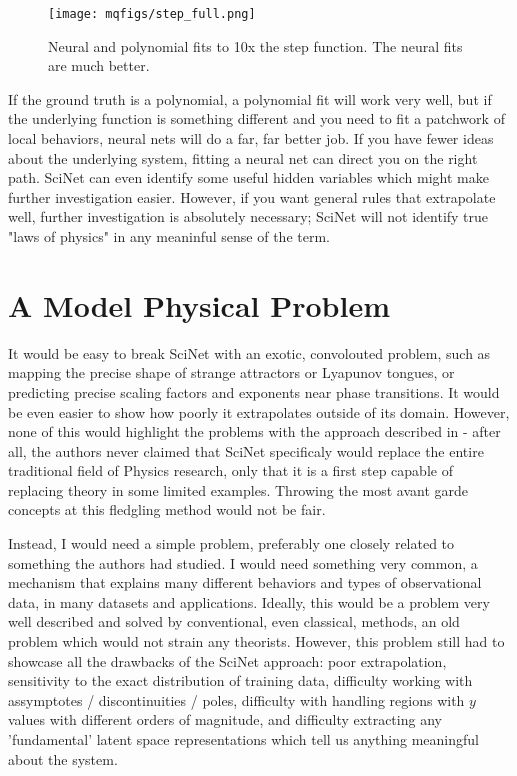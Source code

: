 \documentclass[aps,prl,preprint,groupedaddress]{revtex4-1}
\begin{document}
\begin{figure}[h]
   \centering
   \texttt{[image: mqfigs/step\_full.png]}
   \caption{\label{stepfull} Neural and polynomial fits to 10x the step function. The neural fits are much better.}
\end{figure}

If the ground truth is a polynomial, a polynomial fit will work very well, but if the underlying function is something different and you need to fit a patchwork of local behaviors, neural nets will do a far, far better job. If you have fewer ideas about the underlying system, fitting a neural net can direct you on the right path. SciNet can even identify some useful hidden variables which might make further investigation easier. However, if you want general rules that extrapolate well, further investigation is absolutely necessary; SciNet will not identify true "laws of physics" in any meaninful sense of the term.

\section{A Model Physical Problem}

It would be easy to break SciNet with an exotic, convolouted problem, such as mapping the precise shape of strange attractors or Lyapunov tongues, or predicting precise scaling factors and exponents near phase transitions. It would be even easier to show how poorly it extrapolates outside of its domain. However, none of this would highlight the problems with the approach described in \cite{iten2020} - after all, the authors never claimed that SciNet specificaly would replace the entire traditional field of Physics research, only that it is a first step capable of replacing theory in some limited examples. Throwing the most avant garde concepts at this fledgling method would not be fair.

Instead, I would need a simple problem, preferably one closely related to something the authors had studied. I would need something very common, a mechanism that explains many different behaviors and types of observational data, in many datasets and applications. Ideally, this would be a problem very well described and solved by conventional, even classical, methods, an old problem which would not strain any theorists. However, this problem still had to showcase all the drawbacks of the SciNet approach: poor extrapolation, sensitivity to the exact distribution of training data, difficulty working with assymptotes / discontinuities / poles, difficulty with handling regions with $y$ values with different orders of magnitude, and difficulty extracting any 'fundamental' latent space representations which tell us anything meaningful about the system.
\end{document}
